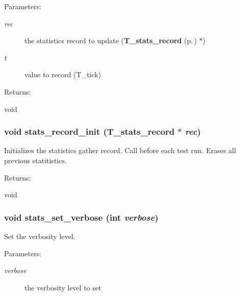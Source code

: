\begin{Desc}
\item[Parameters: ]\par
\begin{description}
\item[{\em 
rec}]the statistics record to update ({\bf T\_\-stats\_\-record} {\rm (p.\,\pageref{structT__stats__record})} $\ast$) \item[{\em 
t}]value to record (T\_\-tick) \end{description}
\end{Desc}
\begin{Desc}
\item[Returns: ]\par
void \end{Desc}
\subsubsection{\setlength{\rightskip}{0pt plus 5cm}void stats\_\-record\_\-init ({\bf T\_\-stats\_\-record} $\ast$ {\em rec})}\label{group__stats_a1}


Initializes the statistics gather record. Call before each test run. Erases all previous statitistics.

\begin{Desc}
\item[Returns: ]\par
void \end{Desc}
\subsubsection{\setlength{\rightskip}{0pt plus 5cm}void stats\_\-set\_\-verbose (int {\em verbose})}\label{group__stats_a6}


Set the verbosity level.

\begin{Desc}
\item[Parameters: ]\par
\begin{description}
\item[{\em 
verbose}]the verbosity level to set \end{description}
\end{Desc}
